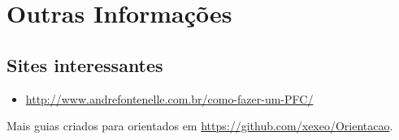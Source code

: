 \chapter{Outras Informações}

\section{Sites interessantes}
\begin{itemize}
    \item \url{http://www.andrefontenelle.com.br/como-fazer-um-PFC/}
\end{itemize}

Mais guias criados para orientados em \url{https://github.com/xexeo/Orientacao}.

